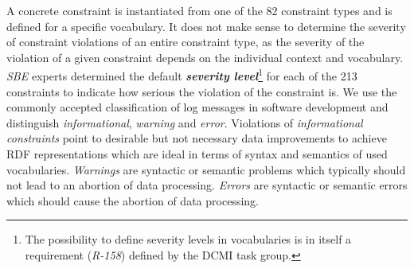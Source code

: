 \documentclass{llncs}
\newcommand{\ke}[1]{\todo[size=\small, color=red!40]{\textbf{Kai:} #1}}
\begin{document}
A concrete constraint is instantiated from one of the 82 constraint types and is defined for a specific vocabulary.
It does not make sense to determine the severity of constraint violations of an entire constraint type,
as the severity of the violation of a given constraint depends on the individual context and vocabulary.
\emph{SBE} experts determined the default \textbf{\emph{severity level}}\footnote{The possibility to define severity levels in vocabularies is in itself a requirement (\emph{R-158}) defined by the DCMI task group.} for each of the 213 constraints to indicate how serious the violation of the constraint is.
We use the commonly accepted classification of log messages in software development and distinguish \emph{informational}, \emph{warning} and \emph{error}.
Violations of \emph{informational constraints} point to desirable but not necessary data improvements to achieve RDF representations which are ideal in terms of syntax and semantics of used vocabularies. 
\emph{Warnings} are syntactic or semantic problems which typically should not lead to an abortion of data processing.
\emph{Errors} are syntactic or semantic errors which should cause the abortion of data processing. 
\end{document}
